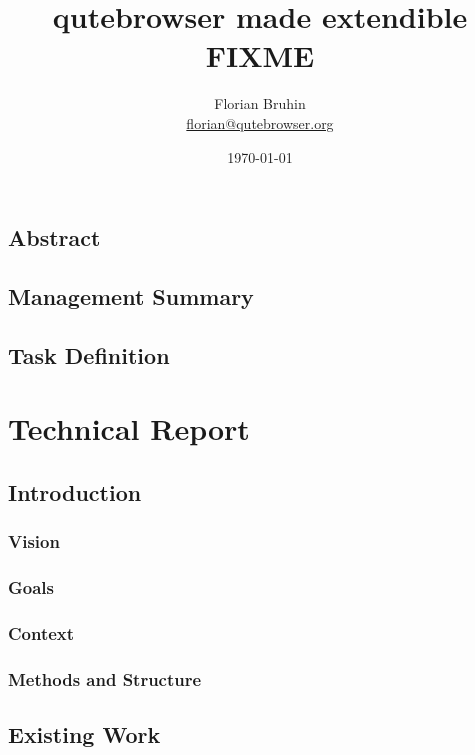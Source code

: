 \documentclass[a4paper,parskip=full]{scrreprt}
\begin{document}
\title{qutebrowser made extendible \\ FIXME}
\author{Florian Bruhin \\ \url{florian@qutebrowser.org}}
\date{\today}
\maketitle

\chapter*{Abstract}

\chapter*{Management Summary}


\tableofcontents
\listoffigures
\listoftables


\chapter*{Task Definition}  

\part{Technical Report}

\chapter{Introduction}
\section{Vision}
\section{Goals}
\section{Context}
\section{Methods and Structure}

\chapter{Existing Work}  
\end{document}
